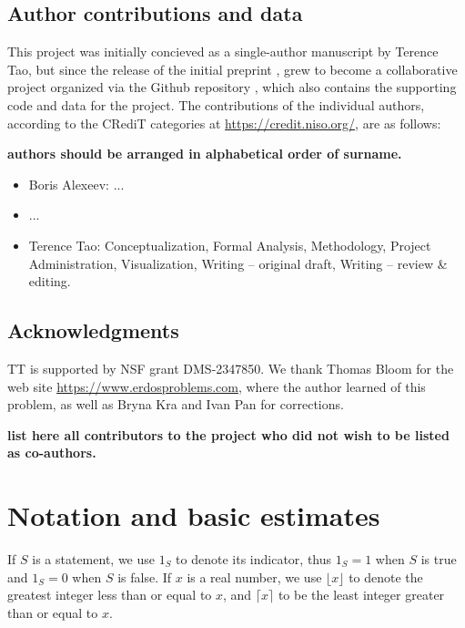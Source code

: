 \documentclass[12pt,a4paper,reqno]{amsart}
\numberwithin{equation}{section}
\theoremstyle{plain}
\theoremstyle{definition}
\begin{document}
\subsection{Author contributions and data}

This project was initially concieved as a single-author manuscript by Terence Tao, but since the release of the initial preprint \cite{tao}, grew to become a collaborative project organized via the Github repository \cite{github}, which also contains the supporting code and data for the project.  The contributions of the individual authors, according to the CRediT categories at \url{https://credit.niso.org/}, are as follows:

{\bf authors should be arranged in alphabetical order of surname.  }

\begin{itemize}
\item Boris Alexeev: ...
\item ...
\item Terence Tao: Conceptualization, Formal Analysis, Methodology, Project Administration, Visualization, Writing -- original draft, Writing -- review \& editing.
\end{itemize}

\subsection{Acknowledgments}

TT is supported by NSF grant DMS-2347850.  We thank Thomas Bloom for the web site \url{https://www.erdosproblems.com}, where the author learned of this problem, as well as Bryna Kra and Ivan Pan for  corrections.

{\bf list here all contributors to the project who did not wish to be listed as co-authors.}


\section{Notation and basic estimates}

If $S$ is a statement, we use $1_S$ to denote its indicator, thus $1_S=1$ when $S$ is true and $1_S=0$ when $S$ is false.  If $x$ is a real number, we use $\lfloor x \rfloor$ to denote the greatest integer less than or equal to $x$, and $\lceil x \rceil$ to be the least integer greater than or equal to $x$.
\end{document}
